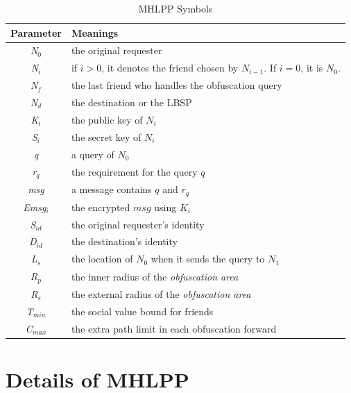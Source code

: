 \begin{table}
\caption{MHLPP Symbols}
\label{table:MhlppSymbols}
\centering
\begin{tabular}{|c|l|} \hline 
Parameter & Meanings \\ \hline 
\textit{N${}_{0}$} & the original requester \\ \hline 
\textit{N${}_{i}$} & if $i>0$, it denotes the friend chosen by ${N}_{i-1}$. \newline If $i=0$, it is ${N}_{0}$. \\ \hline 
\textit{N${}_{f}$} & the last friend who handles the obfuscation query \\ \hline 
\textit{N${}_{d}$} & the destination or the LBSP \\ \hline 
\textit{K${}_{i}$} & the public key of $N_i$ \\ \hline 
\textit{S${}_{i}$} & the secret key of $N_i$  \\ \hline 
\textit{q} & a query of $N_0$ \\ \hline 
\textit{r${}_{q}$} & the requirement for the query $q$ \\ \hline 
\textit{msg} & a message contains $q$ and ${r}_{q}$ \\ \hline 
\textit{Emsg${}_{i}$} & the encrypted $msg$ using ${K}_{i}$ \\ \hline 
\textit{S${}_{id}$} & the original requester's identity \\ \hline 
\textit{D${}_{id}$} & the destination's identity \\ \hline 
\textit{L${}_{s}$} & the location of ${N}_{0}$ when it sends the query to ${N}_{1}$ \\ \hline 
\textit{R${}_{p}$} & the inner radius of the \textit{obfuscation area} \\ \hline 
\textit{R${}_{s}$} & the external radius of the \textit{obfuscation area}  \\ \hline 
\textit{T${}_{min}$} & the social value bound for friends \\ \hline 
\textit{C${}_{max}$} & the extra path limit in each obfuscation forward \\ \hline 
\end{tabular}
\end{table}


\section{ Details of MHLPP}

